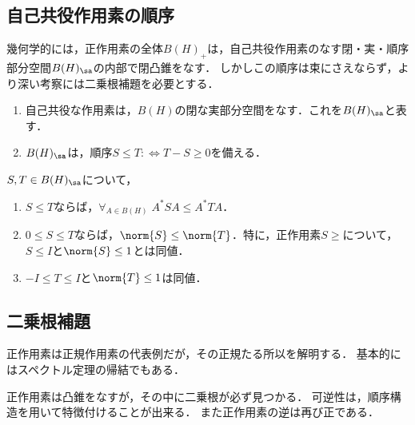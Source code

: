 \documentclass[uplatex,dvipdfmx]{jsreport}
\begin{document}
\subsection{自己共役作用素の順序}

\begin{tcolorbox}[colframe=ForestGreen, colback=ForestGreen!10!white,breakable,colbacktitle=ForestGreen!40!white,coltitle=black,fonttitle=\bfseries\sffamily,
title=]
    幾何学的には，正作用素の全体$B(H)_+$は，自己共役作用素のなす閉・実・順序部分空間$B(H)_\sa$の内部で閉凸錐をなす．
    しかしこの順序は束にさえならず，より深い考察には二乗根補題を必要とする．
\end{tcolorbox}

\begin{proposition}\mbox{}
    \begin{enumerate}
        \item 自己共役な作用素は，$B(H)$の閉な実部分空間をなす．これを$B(H)_\sa$と表す．
        \item $B(H)_\sa$は，順序$S\le T:\Leftrightarrow T-S\ge 0$を備える．
    \end{enumerate}
\end{proposition}

\begin{proposition}[自己共役作用素の順序]\label{prop-order-of-self-adjoint-operator}
    $S,T\in B(H)_\sa$について，
    \begin{enumerate}
        \item $S\le T$ならば，$\forall_{A\in B(H)}\;A^*SA\le A^*TA$．
        \item $0\le S\le T$ならば，$\norm{S}\le\norm{T}$．特に，正作用素$S\ge$について，$S\le I$と$\norm{S}\le1$とは同値．
        \item $-I\le T\le I$と$\norm{T}\le 1$は同値．
    \end{enumerate}
\end{proposition}

\subsection{二乗根補題}

\begin{tcolorbox}[colframe=ForestGreen, colback=ForestGreen!10!white,breakable,colbacktitle=ForestGreen!40!white,coltitle=black,fonttitle=\bfseries\sffamily,
title=]
    正作用素は正規作用素の代表例だが，その正規たる所以を解明する．
    基本的にはスペクトル定理の帰結でもある．

    正作用素は凸錐をなすが，その中に二乗根が必ず見つかる．
    可逆性は，順序構造を用いて特徴付けることが出来る．
    また正作用素の逆は再び正である．
\end{tcolorbox}
\end{document}
